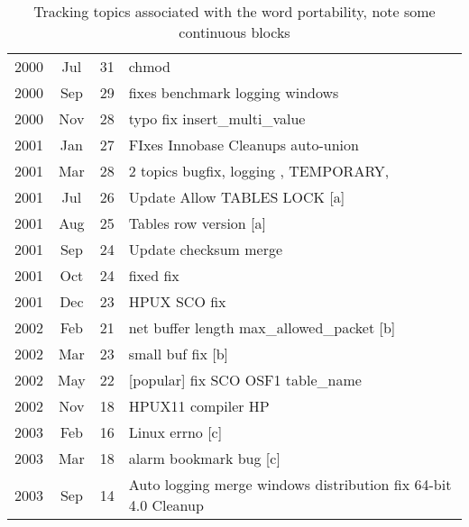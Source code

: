 \documentclass{report}
\begin{document}
\begin{table}
\centering
\begin{tabular}{|ccc|l|}
\hline
2000 &  Jul &  31 &    chmod \\
2000 &  Sep &  29 &    fixes benchmark logging windows \\
2000 &  Nov &  28 &    typo fix insert\_multi\_value \\
2001 &  Jan &  27 &    FIxes Innobase Cleanups auto-union \\
2001 &  Mar &  28 &    2 topics bugfix, logging , TEMPORARY,  \\
\hline
2001 &  Jul &  26 &    Update Allow TABLES LOCK [a] \\ 

2001 &  Aug &  25 &    Tables row version [a] \\
\hline
2001 &  Sep &  24 &    Update checksum merge \\
2001 &  Oct &  24 &    fixed fix \\
2001 &  Dec &  23 &    HPUX SCO fix \\
\hline
2002 &  Feb &  21 &    net buffer length  max\_allowed\_packet [b] \\
2002 &  Mar &  23 &    small buf fix [b]  \\
\hline
2002 &  May &  22 &    [popular] fix SCO OSF1 table\_name \\
2002 &  Nov &  18 &    HPUX11 compiler HP \\
\hline
2003 &  Feb &  16 &    Linux errno  [c] \\
2003 &  Mar &  18 &    alarm bookmark bug [c] \\
\hline
2003 &  Sep &  14 &    Auto logging merge windows distribution fix 64-bit 4.0 Cleanup \\
\hline
\end{tabular}
\caption{Tracking topics associated with the word portability, note some continuous blocks}
\label{tab:portability}
\end{table}
\end{document}
